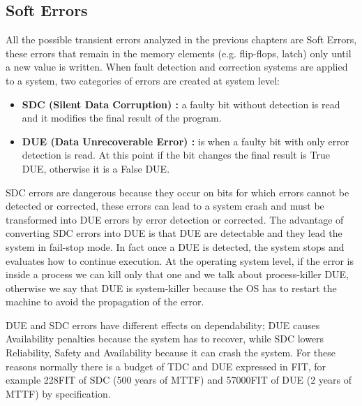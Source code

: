 {{		\subsection{Soft Errors}{
			All the possible transient errors analyzed in the previous chapters are Soft Errors, these errors that remain in the memory elements (e.g. flip-flops, latch) only until a new value is written.
			When fault detection and correction systems are applied to a system, two categories of errors are created at system level:
			\begin{itemize}
				\item \textbf{SDC (Silent Data Corruption) :} a faulty bit without detection is read and it modifies the final result of the program.
				\item \textbf{DUE (Data Unrecoverable Error) :} is when a faulty bit with only error detection is read. At this point if the bit changes the final result is True DUE, otherwise it is a False DUE.   
			\end{itemize}
			SDC errors are dangerous because they occur on bits for which errors cannot be detected or corrected, these errors can lead to a system crash and must be transformed into DUE errors by error detection or corrected. The advantage of converting SDC errors into DUE is that DUE are detectable  and they lead the system in fail-stop mode. In fact once a DUE is detected, the system stops and evaluates how to continue execution. At the operating system level, if the error is inside a process we can kill only that one and we talk about process-killer DUE, otherwise we say that DUE is system-killer because the OS has to restart the machine to avoid the propagation of the error.
			
			DUE and SDC errors have different effects on dependability; DUE causes Availability penalties because the system has to recover, while SDC lowers Reliability, Safety and Availability because it can crash the system. For these reasons normally there is a budget of TDC and DUE expressed in FIT, for example  228FIT of SDC (500 years of MTTF) and 57000FIT of DUE (2 years of MTTF) by specification.   
}}}

